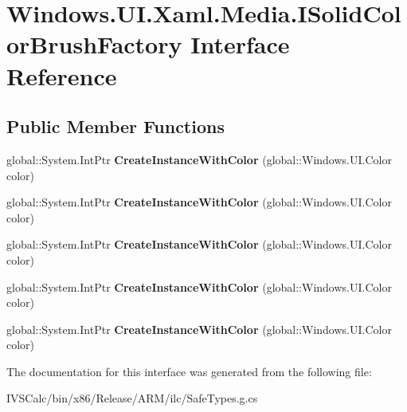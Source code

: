 \hypertarget{interface_windows_1_1_u_i_1_1_xaml_1_1_media_1_1_i_solid_color_brush_factory}{}\section{Windows.\+U\+I.\+Xaml.\+Media.\+I\+Solid\+Color\+Brush\+Factory Interface Reference}
\label{interface_windows_1_1_u_i_1_1_xaml_1_1_media_1_1_i_solid_color_brush_factory}
\subsection*{Public Member Functions}
\begin{DoxyCompactItemize}
\item 
\mbox{\label{interface_windows_1_1_u_i_1_1_xaml_1_1_media_1_1_i_solid_color_brush_factory_ad4d13363b6ee71f38e28d5fed7c36fbb}} 
global\+::\+System.\+Int\+Ptr {\bfseries Create\+Instance\+With\+Color} (global\+::\+Windows.\+U\+I.\+Color color)
\item 
\mbox{\label{interface_windows_1_1_u_i_1_1_xaml_1_1_media_1_1_i_solid_color_brush_factory_ad4d13363b6ee71f38e28d5fed7c36fbb}} 
global\+::\+System.\+Int\+Ptr {\bfseries Create\+Instance\+With\+Color} (global\+::\+Windows.\+U\+I.\+Color color)
\item 
\mbox{\label{interface_windows_1_1_u_i_1_1_xaml_1_1_media_1_1_i_solid_color_brush_factory_ad4d13363b6ee71f38e28d5fed7c36fbb}} 
global\+::\+System.\+Int\+Ptr {\bfseries Create\+Instance\+With\+Color} (global\+::\+Windows.\+U\+I.\+Color color)
\item 
\mbox{\label{interface_windows_1_1_u_i_1_1_xaml_1_1_media_1_1_i_solid_color_brush_factory_ad4d13363b6ee71f38e28d5fed7c36fbb}} 
global\+::\+System.\+Int\+Ptr {\bfseries Create\+Instance\+With\+Color} (global\+::\+Windows.\+U\+I.\+Color color)
\item 
\mbox{\label{interface_windows_1_1_u_i_1_1_xaml_1_1_media_1_1_i_solid_color_brush_factory_ad4d13363b6ee71f38e28d5fed7c36fbb}} 
global\+::\+System.\+Int\+Ptr {\bfseries Create\+Instance\+With\+Color} (global\+::\+Windows.\+U\+I.\+Color color)
\end{DoxyCompactItemize}


The documentation for this interface was generated from the following file\+:\begin{DoxyCompactItemize}
\item 
I\+V\+S\+Calc/bin/x86/\+Release/\+A\+R\+M/ilc/Safe\+Types.\+g.\+cs\end{DoxyCompactItemize}
